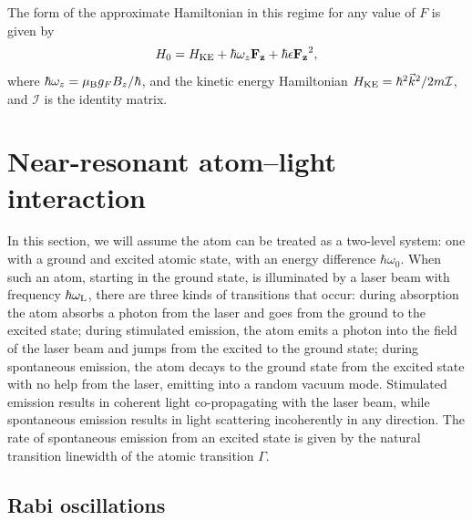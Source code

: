 The form of the approximate Hamiltonian in this regime for any value of $F$ is given by
\begin{equation}
H_0 = H_{\rm KE} + \hbar \omega_z \mathbf{F_z} + \hbar\epsilon \mathbf{F_z}^2,
\end{equation}
where $\hbar \omega_z = \mu_{\rm B} g_F B_z/\hbar$, and the kinetic energy Hamiltonian $H_{\rm KE} = \hbar^2 \vec{k}^2/2m \mathcal{I}$, and $\mathcal{I}$ is the identity matrix.

\section{Near-resonant atom--light interaction}\label{sec:NRatomLight}

In this section, we will assume the atom can be treated as a two-level system: one with a ground and excited atomic state, with an energy difference $\hbar\omega_0$. When such an atom, starting in the ground state, is illuminated by a laser beam with frequency $\hbar\omega_{\rm{L}}$, there are three kinds of transitions that occur: during absorption the atom absorbs a photon from the laser and goes from the ground to the excited state; during stimulated emission, the atom emits a photon into the field of the laser beam and jumps from the excited to the ground state; during spontaneous emission, the atom decays to the ground state from the excited state with no help from the laser, emitting into a random vacuum mode. Stimulated emission results in coherent light co-propagating with the laser beam, while spontaneous emission results in light scattering incoherently in any direction. The rate of spontaneous emission from an excited state is given by the natural transition linewidth of the atomic transition $\Gamma$. 

\subsection{Rabi oscillations}\label{sec:Rabi}

